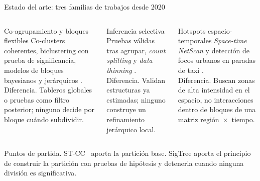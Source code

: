 \documentclass[aspectratio=169,10pt,t]{beamer}
\newcommand{\STCC}{ST-CC}
\begin{document}
\begin{frame}{Estado del arte: tres familias de trabajos desde 2020}
  \small
  \begin{columns}[T]
    \begin{block}{Co-agrupamiento y bloques flexibles}
      \footnotesize
      Co-clusters coherentes, biclustering con prueba de significancia, modelos de bloques bayesianos
      y jerárquicos \cite{Wu2022,Neves2022,Yen2020,Sugahara2023,Watanabe2021gof}.\\[0.5ex]
      \alert{Diferencia.} Tableros globales o pruebas como filtro posterior; ninguno decide por
      bloque cuándo subdividir.
    \end{block}
    \begin{block}{Inferencia selectiva}
      \footnotesize
      Pruebas válidas tras agrupar, \emph{count splitting} y \emph{data thinning}
      \cite{Gao2024,Chen2023,Watanabe2021si,Neufeld2024cs,Neufeld2024dt}.\\[0.5ex]
      \alert{Diferencia.} Validan estructuras ya estimadas; ninguno construye un refinamiento
      jerárquico local.
    \end{block}
    \begin{block}{Hotspots espacio-temporales}
      \footnotesize
      \emph{Space-time NetScan} y detección de focos urbanos en paradas de taxi
      \cite{Shiode2022,Chen2021hotspots}.\\[0.5ex]
      \alert{Diferencia.} Buscan zonas de alta intensidad en el espacio, no interacciones dentro de
      bloques de una matriz región~$\times$~tiempo.
    \end{block}
  \end{columns}
  \vspace{0.8ex}
  {\footnotesize\alert{Puntos de partida.} \STCC\ \cite{Liu2021} aporta la partición base. SigTree \cite{Hu2025} aporta
  el principio de construir la partición con pruebas de hipótesis y detenerla cuando ninguna división es significativa.\par}
\end{frame}
\end{document}
